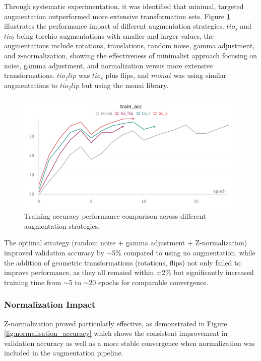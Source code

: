 \documentclass[12pt, a4paper]{article}
\begin{document}
Through systematic experimentation, it was identified that minimal, targeted augmentation outperformed more extensive transformation sets. Figure \ref{fig:augmentation_comparison} illustrates the performance impact of different augmentation strategies. $tio_s$ and $tio_l$ being torchio augmentations with smaller and larger values, the augmentations include rotations, translations, random noise, gamma adjustment, and z-normalization, showing the effectiveness of minimalist approach focusing on noise, gamma adjustment, and normalization versus more extensive transformations. $tio_flip$ was $tio_s$ plus flips, and $monai$ was using similar augmentations to $tio_flip$ but using the monai library.

\begin{figure}[htbp]
  \centering
  \includegraphics[width=\textwidth]{figures/augs_train_acc.png}
  \caption{Training accuracy performance comparison across different augmentation strategies.}
  \label{fig:augmentation_comparison}
\end{figure}

The optimal strategy (random noise + gamma adjustment + Z-normalization) improved validation accuracy by $\sim$5\% compared to using no augmentation, while the addition of geometric transformations (rotations, flips) not only failed to improve performance, as they all remaied within ±2\% but significantly increased training time from $\sim$5 to $\sim$20 epochs for comparable convergence.

\subsubsection{Normalization Impact}

Z-normalization proved particularly effective, as demonstrated in Figure \ref{fig:normalisation_accuracy} which shows the consistent improvement in validation accuracy as well as a more stable convergence when normalization was included in the augmentation pipeline.
\end{document}
